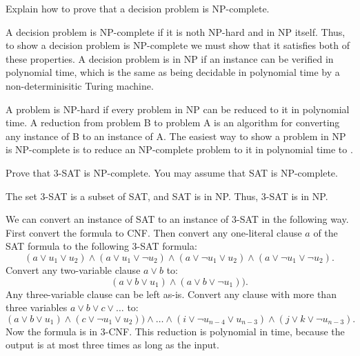 \documentclass[a4paper, 12pt]{exam}
\begin{document}
\begin{questions}
\begin{solution}
  \end{solution}


\question
  Explain how to prove that a decision problem is NP-complete.
  \begin{solution}
    A decision problem is NP-complete if it is noth NP-hard and in NP itself.
    Thus, to show a decision problem is NP-complete we must show that it satisfies both of these properties.
    A decision problem is in NP if an instance can be verified in polynomial time, which is the same as being decidable in polynomial time by a non-determinisitic Turing machine.

    A problem is NP-hard if every problem in NP can be reduced to it in polynomial time.
    A reduction from problem B to problem A is an algorithm for converting any instance of B to an instance of A.
    The easiest way to show a problem in NP is NP-complete is to reduce an NP-complete problem to it in polynomial time to .
  \end{solution}


\question
  Prove that 3-SAT is NP-complete. You may assume that SAT is NP-complete.
  \begin{solution}
    The set 3-SAT is a subset of SAT, and SAT is in NP.
    Thus, 3-SAT is in NP.

    We can convert an instance of SAT to an instance of 3-SAT in the following way.
    First convert the formula to CNF.
    Then convert any one-literal clause $a$ of the SAT formula to the following 3-SAT formula:
      $$(a \lor u_1 \lor u_2) \land (a \lor u_1 \lor \neg u_2) \land (a \lor \neg u_1 \lor u_2) \land (a \lor \neg u_1 \lor \neg u_2).$$
    Convert any two-variable clause $a \lor b$ to:
      $$(a \lor b \lor u_1) \land (a \lor b \lor \neg u_1)).$$
    Any three-variable clause can be left as-is.
    Convert any clause with more than three variables $a \lor b \lor c \lor \ldots$ to:
      $$(a \lor b \lor u_1) \land (c \lor \neg u_1 \lor u_2)) \land \ldots \land (i \lor \neg u_{n-4} \lor u_{n-3}) \land (j \lor k \lor \neg u_{n-3}).$$
    Now the formula is in 3-CNF.
    This reduction is polynomial in time, because the output is at most three times as long as the input.
  \end{solution}



\end{questions}


\end{document}
